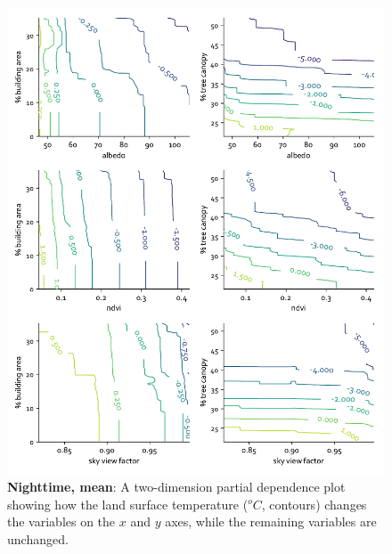 \documentclass[review]{elsarticle}
\begin{document}
\begin{figure}
    \centering
    \includegraphics[width=\linewidth]{fig/report/pdp_2d_night_100.pdf}
    \caption{
    \textbf{Nighttime, mean}: A two-dimension partial dependence plot showing how the land surface temperature ($^oC$, contours) changes the variables on the $x$ and $y$ axes, while the remaining variables are unchanged.
    }
    \label{fig:pdp_2dnight_100}
\end{figure}
\end{document}
